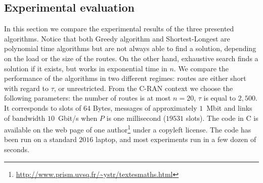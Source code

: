 \documentclass[10pt, conference, letterpaper]{IEEEtran}
\begin{document}
%        
%        
%        
%       
   
   
   
   \subsection{Experimental evaluation}\label{sec:exp_PAZL}
   
   In this section we compare the experimental results of the three presented algorithms.
      Notice that both Greedy algorithm and Shortest-Longest are polynomial time algorithms but are not always able to find a solution, depending on the load or the size of the routes. On the other hand, exhaustive search finds a solution if it exists, but works in exponential time in $n$. We compare the performance of the algorithms in two different regimes: routes are either short with regard to $\tau$, or unrestricted.
      From the C-RAN context we choose the following parameters: the number of routes is at most $n = 20$, $\tau$ is equal to $2,500$. It corresponds to slots of $64$ Bytes, messages of approximately $1$~Mbit and links of bandwidth $10$~Gbit/s when $P$ is one millisecond ($19531$ slots). 
       The code in C is available on the web page of one author\footnote{\url{http://www.prism.uvsq.fr/~ystr/textesmaths.html}} under a copyleft license. The code has been run on a standard $2016$ laptop, and most experiments run in a few dozen of seconds.
\end{document}
